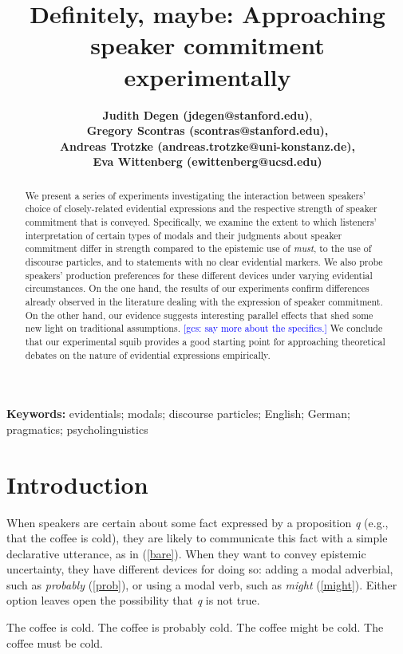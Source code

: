 \documentclass[11pt]{article}
\title{Definitely, maybe: Approaching speaker commitment experimentally}
\author{{\large \bf Judith Degen (jdegen@stanford.edu)}, \\ {\large \bf Gregory Scontras (scontras@stanford.edu),}\\ {\large \bf Andreas Trotzke (andreas.trotzke@uni-konstanz.de),}\\ {\large \bf Eva Wittenberg (ewittenberg@ucsd.edu)}}
\newcommand{\gcs}[1]{\textcolor{blue}{[gcs: #1]}}
\begin{document}
\maketitle

\begin{abstract}

We present a series of experiments investigating the interaction between speakers’ choice of closely-related evidential expressions and the respective strength of speaker commitment that is conveyed. Specifically, we examine the extent to which listeners' interpretation of certain types of modals and their judgments about speaker commitment differ in strength compared to the epistemic use of \emph{must}, to the use of discourse particles, and to statements with no clear evidential markers. We also probe speakers' production preferences for these different devices under varying evidential circumstances. On the one hand, the results of our experiments confirm differences already observed in the literature dealing with the expression of speaker commitment. On the other hand, our evidence suggests interesting parallel effects that shed some new light on traditional assumptions. \gcs{say more about the specifics.} We conclude that our experimental squib provides a good starting point for approaching theoretical debates on the nature of evidential expressions empirically.

\end{abstract}

\textbf{Keywords:} 
evidentials; modals; discourse particles; English; German; pragmatics; psycholinguistics


\section{Introduction}

When speakers are certain about some fact expressed by a proposition \emph{q} (e.g., that the coffee is cold), they are likely to communicate this fact with a simple declarative utterance, as in (\ref{bare}). When they want to convey epistemic uncertainty, they have different devices for doing so: adding a modal adverbial, such as \emph{probably} (\ref{prob}), or using a modal verb, such as \emph{might} (\ref{might}). Either option leaves open the possibility that \emph{q} is not true.

\begin{exe}
	\ex\label{english} \begin{xlist}
		\ex\label{bare} The coffee is cold.
		\ex\label{prob} The coffee is probably cold.
		\ex\label{might} The coffee might be cold.
		\ex\label{must} The coffee must be cold.
	\end{xlist}
\end{exe}
\end{document}
